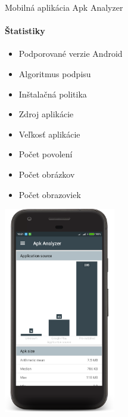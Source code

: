 \documentclass{beamer}
\begin{document}
   \begin{frame}[label=lists]{Mobilná aplikácia Apk Analyzer}
 	 \framesubtitle{Štatistiky}
	\begin{minipage}[htb]{\textwidth}
		\begin{minipage}[t]{0.5\textwidth}
			\hbox{}
			\hbox{}
			\hbox{}
			\begin{itemize}
				\item Podporované verzie Android
				\item Algoritmus podpisu
				\item Inštalačná politika
				\item Zdroj aplikácie
				\item Veľkosť aplikácie
				\item Počet povolení
				\item Počet obrázkov
				\item Počet obrazoviek
			\end{itemize}
     		\vfill
		\end{minipage}%
	\hfill
	\centering
		\begin{minipage}[t][][b]{0.4\textwidth}
		\centering
		\includegraphics[height=9cm]{images/app/statistics_device.png}
		\label{fig:app-detail}
		\end{minipage}%
	\end{minipage}
  \end{frame} 
   
\end{document}
